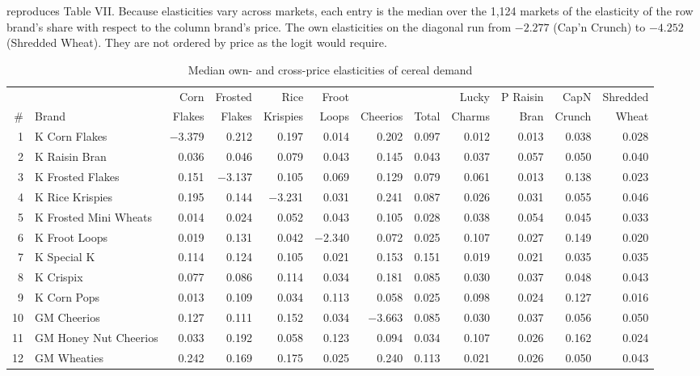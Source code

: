   reproduces Table VII. Because elasticities vary across markets,
each entry is the median over the 1,124 markets of the elasticity of the row brand's share with respect to the
column brand's price. The own elasticities on the diagonal run from $-2.277$ (Cap'n Crunch) to $-4.252$
(Shredded Wheat). They are not ordered by price as the logit would require.

\begin{table}[htbp]
\centering
\caption{Median own- and cross-price elasticities of cereal demand}
\label{tab:08-nevo-elas}
\scriptsize
\setlength{\tabcolsep}{2.6pt}
\begin{tabular}{@{}rlrrrrrrrrrr@{}}
\toprule
 & & Corn & Frosted & Rice & Froot & & & Lucky & P Raisin & CapN & Shredded \\
\# & Brand & Flakes & Flakes & Krispies & Loops & Cheerios & Total & Charms & Bran & Crunch & Wheat \\
\midrule
1 & K Corn Flakes & $-$3.379 & 0.212 & 0.197 & 0.014 & 0.202 & 0.097 & 0.012 & 0.013 & 0.038 & 0.028 \\
2 & K Raisin Bran & 0.036 & 0.046 & 0.079 & 0.043 & 0.145 & 0.043 & 0.037 & 0.057 & 0.050 & 0.040 \\
3 & K Frosted Flakes & 0.151 & $-$3.137 & 0.105 & 0.069 & 0.129 & 0.079 & 0.061 & 0.013 & 0.138 & 0.023 \\
4 & K Rice Krispies & 0.195 & 0.144 & $-$3.231 & 0.031 & 0.241 & 0.087 & 0.026 & 0.031 & 0.055 & 0.046 \\
5 & K Frosted Mini Wheats & 0.014 & 0.024 & 0.052 & 0.043 & 0.105 & 0.028 & 0.038 & 0.054 & 0.045 & 0.033 \\
6 & K Froot Loops & 0.019 & 0.131 & 0.042 & $-$2.340 & 0.072 & 0.025 & 0.107 & 0.027 & 0.149 & 0.020 \\
7 & K Special K & 0.114 & 0.124 & 0.105 & 0.021 & 0.153 & 0.151 & 0.019 & 0.021 & 0.035 & 0.035 \\
8 & K Crispix & 0.077 & 0.086 & 0.114 & 0.034 & 0.181 & 0.085 & 0.030 & 0.037 & 0.048 & 0.043 \\
9 & K Corn Pops & 0.013 & 0.109 & 0.034 & 0.113 & 0.058 & 0.025 & 0.098 & 0.024 & 0.127 & 0.016 \\
10 & GM Cheerios & 0.127 & 0.111 & 0.152 & 0.034 & $-$3.663 & 0.085 & 0.030 & 0.037 & 0.056 & 0.050 \\
11 & GM Honey Nut Cheerios & 0.033 & 0.192 & 0.058 & 0.123 & 0.094 & 0.034 & 0.107 & 0.026 & 0.162 & 0.024 \\
12 & GM Wheaties & 0.242 & 0.169 & 0.175 & 0.025 & 0.240 & 0.113 & 0.021 & 0.026 & 0.050 & 0.043 \\

\end{tabular}
\end{table}
